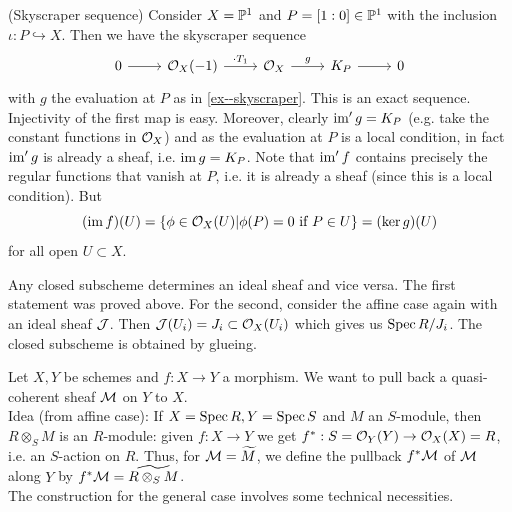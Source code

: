 \documentclass[a4paper,11pt]{article}
\begin{document}
			\begin{eg}
				(Skyscraper sequence) Consider $X=\P^1$ and $P=[1:0]\in\P^1$ with the inclusion $\iota:P\hookrightarrow X$. Then we have the skyscraper sequence
				\begin{equation*}
					\begin{tikzcd}
						0\ar[r] & \O_{X}(-1)\ar[r,"\cdot T_1"] & \O_X\ar[r,"g"] & K_P\ar[r] & 0
					\end{tikzcd}
				\end{equation*}
				with $g$ the evaluation at $P$ as in \autoref{ex--skyscraper}. This is an exact sequence. Injectivity of the first map is easy. Moreover, clearly $\im^\prime g=K_P$ (e.g. take the constant functions in $\O_X$) and as the evaluation at $P$ is a local condition, in fact $\im^\prime g$ is already a sheaf, i.e. $\im g=K_P$. Note that $\im^\prime f$ contains precisely the regular functions that vanish at $P$, i.e. it is already a sheaf (since this is a local condition). But
				\begin{equation*}
					(\im f)(U)=\{\phi\in\O_X(U)|\phi(P)=0\text{ if }P\in U\}=(\ker g)(U)
				\end{equation*}
				for all open $U\subset X$.
			\end{eg}
			
			\begin{remark}
				Any closed subscheme determines an ideal sheaf and vice versa. The first statement was proved above. For the second, consider the affine case again with an ideal sheaf $\J$. Then $\J(U_i)=J_i\subset\O_X(U_i)$ which gives us $\spec R/J_i$. The closed subscheme is obtained by glueing.
			\end{remark}

			Let $X,Y$ be schemes and $f:X\rightarrow Y$ a morphism. We want to pull back a quasi-coherent sheaf $\M$ on $Y$ to $X$.
			\\

			\noindent Idea (from affine case): If $X=\spec R,Y=\spec S$ and $M$ an $S$-module, then $R\otimes_SM$ is an $R$-module: given $f:X\rightarrow Y$ we get $f^\ast:S=\O_Y(Y)\rightarrow\O_X(X)=R$, i.e. an $S$-action on $R$. Thus, for $\M=\widetilde{M}$, we define the pullback $f^\ast\M$ of $\M$ along $Y$ by $f^\ast\M=\widetilde{R\otimes_SM}$.
			\\
			
			\noindent The construction for the general case involves some technical necessities.
\end{document}
